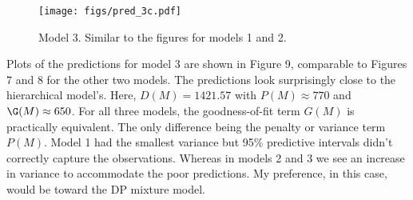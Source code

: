 \documentclass[12pt]{article}
\begin{document}
\begin{figure}[H]
\begin{center}
\texttt{[image: figs/pred\_3c.pdf]}
\caption{Model 3. Similar to the figures for models 1 and 2.}
\end{center}
\end{figure}

Plots of the predictions for model 3 are shown in Figure 9, comparable to Figures 7 and 8 for the other two models. The predictions look surprisingly close to the hierarchical model's. Here, $D(M)=1421.57$ with $P(M)\approx 770$ and $\G(M)\approx 650$. For all three models, the goodness-of-fit term $G(M)$ is practically equivalent. The only difference being the penalty or variance term $P(M)$. Model 1 had the smallest variance but 95\% predictive intervals didn't correctly capture the observations. Whereas in models 2 and 3 we see an increase in variance to accommodate the poor predictions. My preference, in this case, would be toward the DP mixture model.




\end{document}

